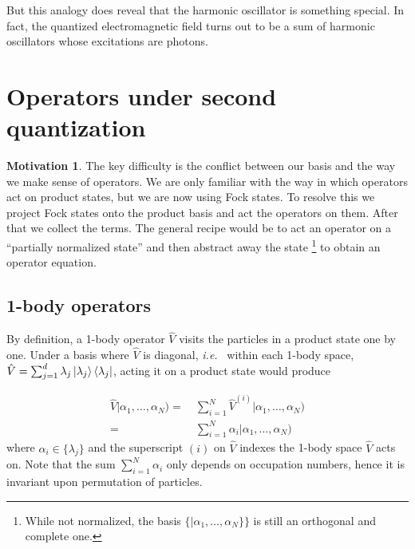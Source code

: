 \documentclass{article}
\theoremstyle{definition}
\newtheorem{mot}{Motivation}[section]
\numberwithin{equation}{section}
\begin{document}
But this analogy does reveal that 
the harmonic oscillator is something special. 
In fact, the quantized electromagnetic field 
turns out to be a sum of harmonic oscillators 
whose excitations are photons.

\section{Operators under second quantization}

\begin{mot}
    The key difficulty is the conflict between our basis 
    and the way we make sense of operators. We are only familiar 
    with the way in which operators act on product states, but 
    we are now using Fock states.    
    To resolve this 
    we project Fock states onto the product basis 
    and act the operators on them. After that we 
    collect the terms. The general recipe would be 
    to act an operator on a 
    ``partially normalized state'' 
    and then abstract away the state 
    \footnote{
        While not normalized, the basis 
        $\{ |\alpha_1, \ldots ,\alpha_{N}\} \}$
        is still an orthogonal and complete one.
    }
    to obtain an operator equation.
\label{mot:operators-under-second-quantization}
\end{mot}

\subsection{1-body operators}

By definition, a 1-body operator $\hat{V}$ visits 
the particles in a product state one by one. 
Under a basis where $\hat{V}$ is diagonal, \textit{i.e.}~
within each 1-body space, 
$\hat{V}
=
\sum_{j=1}^{d}\lambda_{j} 
\ket{\lambda_{j}}
\bra{\lambda_{j}}
$, acting it on a product state would produce 

\begin{align*}
    \hat{V}
    |\alpha_1, \ldots ,\alpha_{N})
    =&\ 
    \sum_{i = 1}^{N}
    \hat{V}^{(i)}
    |\alpha_1, \ldots ,\alpha_{N}) \\
    =&\ 
    \sum_{i = 1}^{N}
    \alpha_{i}
    |\alpha_1, \ldots ,\alpha_{N})
\end{align*}
where $\alpha_{i}\in \{\lambda_{j}\}$ and 
the superscript $(i)$ on $\hat{V}$ 
indexes the 1-body space $\hat{V}$ acts on. 
Note that the sum $\sum_{i=1}^{N}\alpha_{i}$ 
only depends on occupation numbers, hence 
it is invariant upon permutation of particles.
\end{document}

